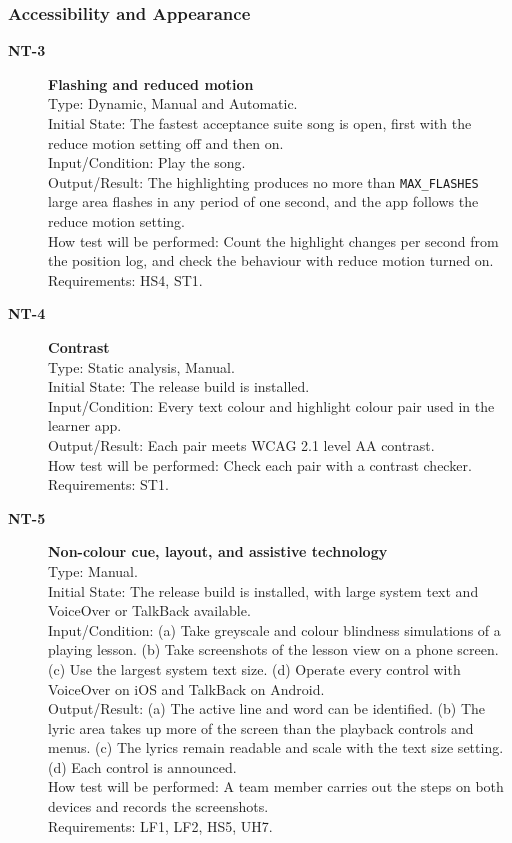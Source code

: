 \documentclass[12pt, titlepage]{article}
\newcommand{\tid}[1]{\hypertarget{test:#1}{\textbf{#1}}}
\newcommand{\cn}[1]{\texttt{#1}}
\begin{document}
\subsubsection{Accessibility and Appearance} \label{SecAccessTests}

\begin{description}

\item[\tid{NT-3}] \textbf{Flashing and reduced motion}\\
Type: Dynamic, Manual and Automatic.\\
Initial State: The fastest acceptance suite song is open, first with the reduce
motion setting off and then on.\\
Input/Condition: Play the song.\\
Output/Result: The highlighting produces no more than \cn{MAX\_FLASHES} large area
flashes in any period of one second, and the app follows the reduce motion
setting.\\
How test will be performed: Count the highlight changes per second from the
position log, and check the behaviour with reduce motion turned on.\\
Requirements: HS4, ST1.

\item[\tid{NT-4}] \textbf{Contrast}\\
Type: Static analysis, Manual.\\
Initial State: The release build is installed.\\
Input/Condition: Every text colour and highlight colour pair used in the
learner app.\\
Output/Result: Each pair meets WCAG 2.1 level AA contrast.\\
How test will be performed: Check each pair with a contrast checker.\\
Requirements: ST1.

\item[\tid{NT-5}] \textbf{Non-colour cue, layout, and assistive technology}\\
Type: Manual.\\
Initial State: The release build is installed, with large system text and
VoiceOver or TalkBack available.\\
Input/Condition: (a) Take greyscale and colour blindness simulations of a
playing lesson. (b) Take screenshots of the lesson view on a phone screen. (c)
Use the largest system text size. (d) Operate every control with VoiceOver on
iOS and TalkBack on Android.\\
Output/Result: (a) The active line and word can be identified. (b) The lyric
area takes up more of the screen than the playback controls and menus. (c) The
lyrics remain readable and scale with the text size setting. (d) Each control is
announced.\\
How test will be performed: A team member carries out the steps on both devices
and records the screenshots.\\
Requirements: LF1, LF2, HS5, UH7.

\end{description}
\end{document}
